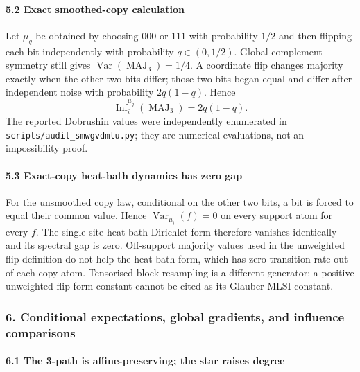 \paragraph{5.2 Exact smoothed-copy calculation}\label{exact-smoothed-copy-calculation}

Let \(\mu_q\) be obtained by choosing \(000\) or \(111\) with probability \(1/2\) and then flipping each bit independently with probability \(q\in(0,1/2)\). Global-complement symmetry still gives \(\operatorname{Var}(\operatorname{MAJ}_3)=1/4\). A coordinate flip changes majority exactly when the other two bits differ; those two bits began equal and differ after independent noise with probability \(2q(1-q)\). Hence
\[\operatorname{Inf}_i^{\mu_q}(\operatorname{MAJ}_3)=2q(1-q).\]
The reported Dobrushin values were independently enumerated in \texttt{scripts/audit\_smwgvdmlu.py}; they are numerical evaluations, not an impossibility proof.

\paragraph{5.3 Exact-copy heat-bath dynamics has zero gap}\label{exact-copy-heat-bath-dynamics-has-zero-gap}

For the unsmoothed copy law, conditional on the other two bits, a bit is forced to equal their common value. Hence \(\operatorname{Var}_{\mu_i}(f)=0\) on every support atom for every \(f\). The single-site heat-bath Dirichlet form therefore vanishes identically and its spectral gap is zero. Off-support majority values used in the unweighted flip definition do not help the heat-bath form, which has zero transition rate out of each copy atom. Tensorised block resampling is a different generator; a positive unweighted flip-form constant cannot be cited as its Glauber MLSI constant.

\subsubsection{6. Conditional expectations, global gradients, and influence comparisons}\label{conditional-expectations-global-gradients-and-influence-comparisons}

\paragraph{6.1 The 3-path is affine-preserving; the star raises degree}\label{the-3-path-is-affine-preserving-the-star-raises-degree}


